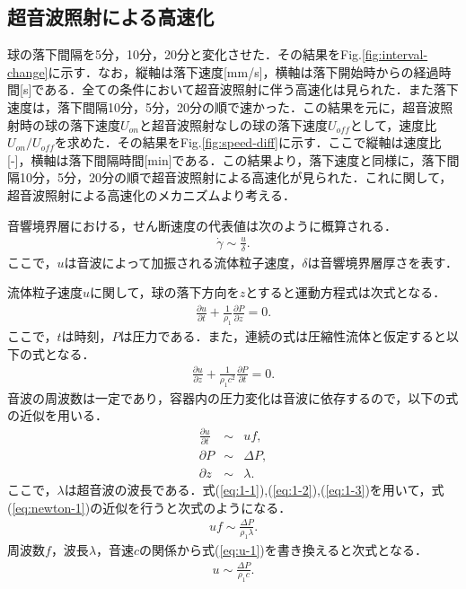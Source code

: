 \clearpage

\subsection{超音波照射による高速化}

球の落下間隔を5分，10分，20分と変化させた．その結果をFig.\ref{fig:interval-change}に示す．なお，縦軸は落下速度[mm/s]，横軸は落下開始時からの経過時間[s]である．全ての条件において超音波照射に伴う高速化は見られた．また落下速度は，落下間隔10分，5分，20分の順で速かった．この結果を元に，超音波照射時の球の落下速度$U_{on}$と超音波照射なしの球の落下速度$U_{off}$として，速度比$U_{on}/U_{off}$を求めた．その結果をFig.\ref{fig:speed-diff}に示す．ここで縦軸は速度比[-]，横軸は落下間隔時間[min]である．この結果より，落下速度と同様に，落下間隔10分，5分，20分の順で超音波照射による高速化が見られた．これに関して，超音波照射による高速化のメカニズムより考える．

音響境界層における，せん断速度の代表値は次のように概算される．
\begin{eqnarray}
    \dot{\gamma} \sim \frac{u}{\delta} .
    \label{eq:abl-delta}
\end{eqnarray}
ここで，$u$は音波によって加振される流体粒子速度，$\delta$は音響境界層厚さを表す．

流体粒子速度$u$に関して，球の落下方向を$z$とすると運動方程式は次式となる．
\begin{eqnarray}
    \frac{\partial u}{\partial t} + \frac{1}{\rho_1}\frac{\partial P}{\partial z} = 0 .
    \label{eq:newton-1}
\end{eqnarray}
ここで，$t$は時刻，$P$は圧力である．また，連続の式は圧縮性流体と仮定すると以下の式となる．
\begin{eqnarray}
    \frac{\partial u}{\partial z} + \frac{1}{\rho_1 c^2}\frac{\partial P}{\partial t} = 0 .
\end{eqnarray}
音波の周波数は一定であり，容器内の圧力変化は音波に依存するので，以下の式の近似を用いる．
\begin{eqnarray}
    \frac{\partial u}{\partial t} &\sim& uf ,\label{eq:1-1}\\
    \partial P &\sim& \Delta P ,\label{eq:1-2}\\
    \partial z &\sim& \lambda .\label{eq:1-3}
\end{eqnarray}
ここで，$\lambda$は超音波の波長である．式(\ref{eq:1-1}),(\ref{eq:1-2}),(\ref{eq:1-3})を用いて，式(\ref{eq:newton-1})の近似を行うと次式のようになる．
\begin{eqnarray}
    uf \sim \frac{\Delta P}{\rho_1 \lambda} .
    \label{eq:u-1}
\end{eqnarray}
周波数$f$，波長$\lambda$，音速$c$の関係から式(\ref{eq:u-1})を書き換えると次式となる．
\begin{eqnarray}
    u \sim \frac{\Delta P}{\rho_1 c} .
\end{eqnarray}

